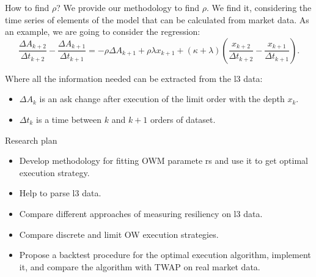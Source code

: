 \documentclass[aspectratio=169]{beamer}
\begin{document}
\begin{frame}{How to find $\rho$?}
    We provide our methodology to find $\rho$. We find it, considering the time series of elements of the model 
    that can be calculated from market data. As an example, we are going to consider the regression:                                                                                                                                                                                                                                                                                                                                                                                        
            \begin{equation*}
                \frac{\Delta A_{k+2}}{\Delta t_{k+2}} - \frac{\Delta A_{k+1}}{\Delta t_{k+1}} 
        = - \rho \Delta A_{k+1} + \rho \lambda x_{k+1} + (\kappa + \lambda) (\frac{x_{k+2}}{\Delta t_{k+2}} - \frac{x_{k+1}}{\Delta t_{k+1}}).
            \end{equation*}

        Where all the information needed can be extracted from the l3 data: 
        \begin{itemize}
            \item $\Delta A_{k}$ is an ask change after execution of the limit order with the depth $x_k$.
            \item $\Delta t_{k}$ is a time between $k$ and $k + 1$ orders of dataset.
        \end{itemize}
\end{frame}

\begin{frame}{Research plan}
    \begin{itemize}
        \item Develop methodology for fitting OWM paramete  rs and use it to get optimal execution strategy. 
        \item Help to parse l3 data.
        \item Compare different approaches of measuring resiliency on l3 data.
        \item Compare discrete and limit OW execution strategies.
        \item Propose a backtest procedure for the optimal execution algorithm, implement it, and compare the algorithm with TWAP
        on real market data.
    \end{itemize}
\end{frame}
\end{document}
